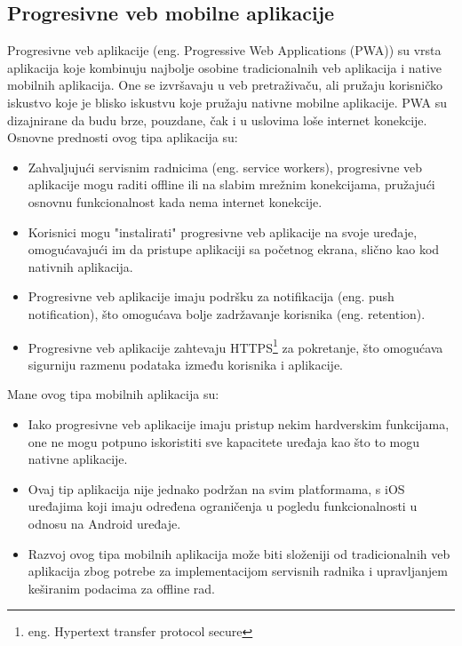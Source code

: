 \documentclass[12pt,oneside]{memoir}
\begin{document}
\subsection{Progresivne veb mobilne aplikacije}

Progresivne veb aplikacije (eng. Progressive Web Applications (PWA)) su vrsta aplikacija koje kombinuju najbolje osobine tradicionalnih veb aplikacija i native mobilnih aplikacija. One se izvršavaju u veb pretraživaču, ali pružaju korisničko iskustvo koje je blisko iskustvu koje pružaju nativne mobilne aplikacije. PWA su dizajnirane da budu brze, pouzdane, čak i u uslovima loše internet konekcije. Osnovne prednosti ovog tipa aplikacija su:

\begin{itemize}
    \item Zahvaljujući servisnim radnicima (eng. service workers), progresivne veb aplikacije mogu raditi offline ili na slabim mrežnim konekcijama, pružajući osnovnu funkcionalnost kada nema internet konekcije.
    \item Korisnici mogu "instalirati" progresivne veb aplikacije na svoje uređaje, omogućavajući im da pristupe aplikaciji sa početnog ekrana, slično kao kod nativnih aplikacija.
    \item Progresivne veb aplikacije imaju podršku za notifikacija (eng. push notification), što omogućava bolje zadržavanje korisnika (eng. retention).
    \item Progresivne veb aplikacije zahtevaju HTTPS\footnote{eng. Hypertext transfer protocol secure} za pokretanje, što omogućava sigurniju razmenu podataka između korisnika i aplikacije.
\end{itemize}
Mane ovog tipa mobilnih aplikacija su:
\begin{itemize}
    \item Iako progresivne veb aplikacije imaju pristup nekim hardverskim funkcijama, one ne mogu potpuno iskoristiti sve kapacitete uređaja kao što to mogu nativne aplikacije.
    \item Ovaj tip aplikacija nije jednako podržan na svim platformama, s iOS uređajima koji imaju određena ograničenja u pogledu funkcionalnosti u odnosu na Android uređaje.
    \item Razvoj ovog tipa mobilnih aplikacija može biti složeniji od tradicionalnih veb aplikacija zbog potrebe za implementacijom servisnih radnika i upravljanjem keširanim podacima za offline rad.
\end{itemize}
\end{document}
